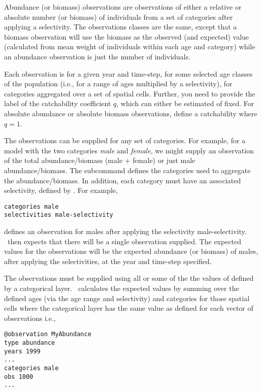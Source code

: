 {{{{Abundance (or biomass) observations are observations of either a relative or absolute number (or biomass) of individuals from a set of categories after applying a selectivity. The observations classes are the same, except that a biomass observation will use the biomass as the observed (and expected) value (calculated from mean weight of individuals within each age and category) while an abundance observation is just the number of individuals. 

Each observation is for a given year and time-step, for some selected age classes of the population (i.e., for a range of ages multiplied by a selectivity), for categories aggregated over a set of spatial cells. Further, you need to provide the label of the catchability coefficient $q$, which can either be estimated of fixed. For absolute abundance or absolute biomass observations, define a catchability where $q=1$.

The observations can be supplied for any set of categories. For example, for a model with the two categories \emph{male} and \emph{female}, we might supply an observation of the total abundance/biomass (male $+$ female) or just male abundance/biomass. The subcommand  defines the categories used to aggregate the abundance/biomass. In addition, each category must have an associated selectivity, defined by . For example,  

{\small{\begin{verbatim}
categories male
selectivities male-selectivity
\end{verbatim}}}

defines an observation for males after applying the selectivity male-selectivity. \CNAME\ then expects that there will be a single observation supplied. The expected values for the observations will be the expected abundance (or biomass) of males, after applying the selectivities, at the year and time-step specified. 

The observations must be supplied using all or some of the the values of defined by a categorical layer. \CNAME\ calculates the expected values by summing over the defined ages (via the age range and selectivity) and categories for those spatial cells where the categorical layer has the same value as defined for each vector of observations i.e.,


{\small{\begin{verbatim}
@observation MyAbundance
type abundance
years 1999
...
categories male 
obs 1000
...
\end{verbatim}}}

}}}}
